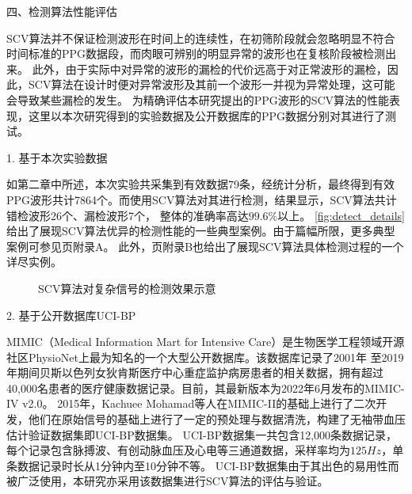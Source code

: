 四、检测算法性能评估

SCV算法并不保证检测波形在时间上的连续性，在初筛阶段就会忽略明显不符合时间标准的PPG数据段，而肉眼可辨别的明显异常的波形也在复核阶段被检测出来。
此外，由于实际中对异常的波形的漏检的代价远高于对正常波形的漏检，因此，SCV算法在设计时便对异常波形及其前一个波形一并视为异常处理，这可能会导致某些漏检的发生。
为精确评估本研究提出的PPG波形的SCV算法的性能表现，这里以本次研究得到的实验数据及公开数据库的PPG数据分别对其进行了测试。

1. 基于本次实验数据

如第二章中所述，本次实验共采集到有效数据79条，经统计分析，最终得到有效PPG波形共计7864个。而使用SCV算法对其进行检测，结果显示，SCV算法共计错检波形26个、漏检波形7个，
整体的准确率高达$99.6\%$以上。
\autoref{fig:detect_details}给出了展现SCV算法优异的检测性能的一些典型案例。由于篇幅所限，更多典型案例可参见\pageref{fig:detect_details2}页附录A。
此外，\pageref{fig:detectcheck}页附录B也给出了展现SCV算法具体检测过程的一个详尽实例。
\begin{figure}[h]
    \centering
    \quad
    \quad
    \quad
    \caption{\label{fig:detect_details}SCV算法对复杂信号的检测效果示意}
\end{figure}

2. 基于公开数据库UCI-BP

MIMIC（Medical Information Mart for Intensive Care）是生物医学工程领域开源社区PhysioNet上最为知名的一个大型公开数据库\cite{mit2022,Goldberger2000,johnson2018mimic}。该数据库记录了2001年
至2019年期间贝斯以色列女狄肯斯医疗中心重症监护病房患者的相关数据，拥有超过40,000名患者的医疗健康数据记录\cite{johnson2018mimic}。目前，其最新版本为2022年6月发布的MIMIC-IV v2.0\cite{mimic4}。
2015年，Kachuee Mohamad等人在MIMIC-II的基础上进行了二次开发，他们在原始信号的基础上进行了一定的预处理与数据清洗，构建了无袖带血压估计验证数据集即UCI-BP数据集\cite{Kachuee2015,ucibp2022}。
UCI-BP数据集一共包含12,000条数据记录，每个记录包含脉搏波、有创动脉血压及心电等三通道数据，采样率均为$125Hz$，单条数据记录时长从1分钟内至10分钟不等。
UCI-BP数据集由于其出色的易用性而被广泛使用，本研究亦采用该数据集进行SCV算法的评估与验证。

